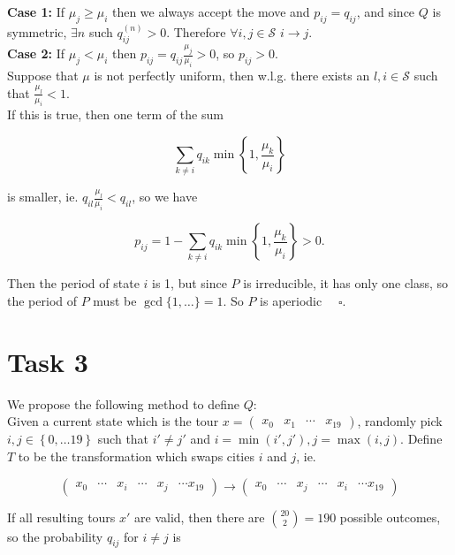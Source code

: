 \documentclass[6pt,oneside]{article}
\begin{document}
\textbf{Case 1:} If $\mu_j \geq \mu_i$ then we always accept the move and $p_{ij} = q_{ij}$,
and since $Q$ is symmetric, $\exists n$ such $q_{ij}^{(n)} > 0$. Therefore
$\forall i,j\in\mathcal{S}$ $i\longrightarrow j$.\\

\textbf{Case 2:} If $\mu_j < \mu_i$ then $p_{ij} =  q_{ij}\frac{\mu_j}{\mu_i} > 0$, so
$p_{ij} > 0$.\\

Suppose that $\mu$ is not perfectly uniform, then w.l.g. there exists an $l,i\in\mathcal{S}$
such that $\frac{\mu_l}{\mu_i} < 1$.\\

If this is true, then one term of the sum

$$
\sum_{k\neq i} q_{ik} \min\left\lbrace 1, \frac{\mu_k}{\mu_i} \right\rbrace
$$

is smaller, ie. $q_{il} \frac{\mu_l}{\mu_i} < q_{il}$, so we have

$$
p_{ij} = 1 - \sum_{k\neq i} q_{ik} \min\left\lbrace 1, \frac{\mu_k}{\mu_i}\right\rbrace
> 0.
$$

Then the period of state $i$ is 1, but
since $P$ is irreducible, it has only one class, so the period of $P$ must be $\gcd\lbrace 1,\ldots\rbrace = 1$.
So $P$ is aperiodic $\quad\square$.

\section*{Task 3}

We propose the following method to define $Q$:\\

Given a current state which is the tour $x=\begin{pmatrix} x_0 & x_1 & \cdots & x_{19} \end{pmatrix}$,
randomly pick $i, j \in \left\lbrace 0, \ldots 19\right\rbrace$ such that $i'\neq j'$ and
$i = \min(i',j'), j=\max( i, j)$. Define $T$ to be the transformation which swaps cities $i$ and $j$,
ie.

$$
\begin{pmatrix} x_0 & \cdots & x_i & \cdots & x_j & \cdots x_{19}\end{pmatrix}
\longrightarrow
\begin{pmatrix} x_0 & \cdots & x_j & \cdots & x_i & \cdots x_{19}\end{pmatrix}
$$

If all resulting tours $x'$ are valid, then there are $\binom{20}{2}=190$ possible
outcomes, so the probability $q_{ij}$ for $i\neq j$ is
\end{document}

